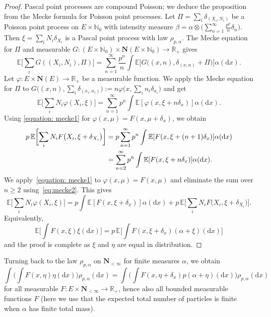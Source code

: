 \documentclass[pdftex]{sigma}
\numberwithin{equation}{section}
\newcommand{\N}{\mathbb{N}}
\newcommand{\R}{\mathbb{R}}
\newcommand{\E}{\mathbb{E}}
\newcommand{\dd}{\mathrm{d}} %
\newcommand{\1}{\mathbbm{1}}
\begin{document}
\begin{proof}
	Pascal point processes are compound Poisson; we deduce the proposition from the Mecke formula for Poisson point processes. Let $\Pi = \sum_i \delta_{(X_i,N_i)}$ be a Poisson point process on $E\times \N_0$ with intensity measure $\beta = \alpha\otimes \bigl(\sum_{n=1}^\infty \frac{p^n}{n} \delta_n\bigr)$. Then $\xi = \sum_i N_i \delta_{X_i}$ is a Pascal point process with law $\rho_{p,\alpha}$. The Mecke equation for $\Pi$ \cite[Theorem 4.1]{LastPenroseLecturesOnThePoissonProcess} and measurable $G\colon (E\times \N_0)\times \mathbf N(E\times \N_0) \to \R_+$ gives
\[
	\E\biggl[ \sum_i G( (X_i, N_i), \Pi )\biggr] = \sum_{n=1}^\infty \frac{p^n}{n} \int \E\bigl[ G\bigl( (x,n), \delta_{(x,n)} + \Pi\bigr) \bigr] \alpha (\dd x).
\]
Let $\varphi\colon E\times \mathbf N(E)\to \R_+$ be a measurable function. We apply the Mecke equation for $\Pi$ to $G\bigl((x,n),\sum_i \delta_{(x_i,n_i)}\bigr):= n \varphi\bigl(x, \sum_i n_i \delta_{x_i}\bigr)$ and get
\begin{equation}
 \label{equation: mecke1}
	\E\biggl[\sum_i N_i \varphi( X_i, \xi)\biggr] = \sum_{n=1}^\infty p^n \int \E[ \varphi(x, \xi+ n \delta_x)] \alpha(\dd x).
\end{equation}
Using \eqref{equation: mecke1} for $\varphi(x,\mu) = F(x,\mu + \delta_x)$, we obtain
\begin{align}
 p\, \E \biggl[ \sum_i N_i F\bigl( X_i, \xi +\delta_{X_i}\bigr)\biggr] &= p\sum_{n=1}^\infty p^n \int \E [ F(x, \xi + (n+1) \delta_{x}) ]\alpha(\dd x) \notag \\
 &= \sum_{n=2}^\infty p^n \int \E [ F(x, \xi + n \delta_{x}) ] \alpha(\dd x). \label{eq:mecke2}
\end{align}
We apply~\eqref{equation: mecke1} to $\varphi(x,\mu) = F(x,\mu)$ and eliminate the sum over $n\geq 2$ using~\eqref{eq:mecke2}. This gives
\begin{equation*}
	\E\biggl[\sum_i N_i \varphi( X_i, \xi)\biggr] =
		p \int \E[ F(x, \xi+ \delta_x)] \alpha(\dd x) + p\, \E \biggl[ \sum_i N_i F\bigl( X_i, \xi +\delta_{X_i}\bigr)\biggr].
\end{equation*}
Equivalently,
\[
	\E\biggl[ \int F(x,\xi) \xi(\dd x)\biggr] = p\, \E\biggl[ \int F(x, \xi+\delta_x) (\alpha + \xi)(\dd x)\biggr]
\]
and the proof is complete as $\xi$ and $\eta$ are equal in distribution.
\end{proof}

Turning back to the law $\rho_{p,\alpha}$ on $\mathbf N_{<\infty}$ for finite measures $\alpha$, we obtain
\begin{equation} \label{eq:papangelou}
	\int \biggl( \int F(x,\eta)\eta(\dd x)\biggr) \rho_{p,\alpha}(\dd x)
	= \int\biggl( \int F(x,\eta+\delta_x) p (\alpha+\eta)(\dd x)\biggr) \rho_{p,\alpha}(\dd x)
\end{equation}
for all measurable $F\colon E\times \mathbf N_{<\infty}\to \R_+$, hence also all bounded measurable functions $F$ (here we use that the expected total number of particles is finite when $\alpha$ has finite total mass).
\end{document}

